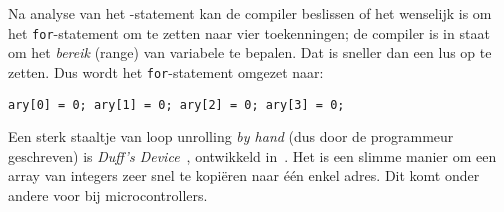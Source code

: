 Na analyse van het -statement kan de compiler beslissen of het wenselijk is om het \texttt{for}-statement om te zetten naar vier toekenningen; de compiler is in staat om het \textsl{bereik} (range) van variabele  te bepalen. Dat is sneller dan een lus op te zetten. Dus wordt het \texttt{for}-statement omgezet naar:

\begin{lstlisting}[style=lstoneline]
ary[0] = 0; ary[1] = 0; ary[2] = 0; ary[3] = 0;
\end{lstlisting}

Een sterk staaltje van loop unrolling \textsl{by hand} (dus door de programmeur geschreven) is \textsl{Duff's Device}~\cite{duffsdevice}, ontwikkeld in~\citeyear{duffsdevice}. Het is een slimme manier om een array van integers zeer snel te kopiëren naar één enkel adres. Dit komt onder andere voor bij microcontrollers.

